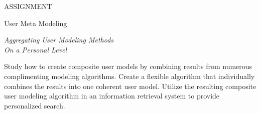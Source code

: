 \null\vspace{6em}

{
  \centering
  \color{gray}
  ASSIGNMENT
  \color{black}
  \vspace{1em}
  
  \LARGE{User Meta Modeling}\\
  \vspace{1em}
  
  \itshape
  \large{Aggregating User Modeling Methods}\\
  \large{On a Personal Level}\\
}

\vspace{3em}

Study how to create composite user models by combining results
from numerous complimenting modeling algorithms. Create a flexible 
algorithm that individually combines the results into one coherent user model.
Utilize the resulting composite user modeling algorithm in an
information retrieval system to provide personalized search.

\vfill

